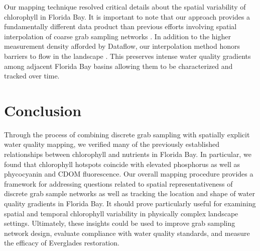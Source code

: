 Our mapping technique resolved critical details about the spatial variability of chlorophyll in Florida Bay. It is important to note that our approach provides a fundamentally different data product than previous efforts involving spatial interpolation of coarse grab sampling networks \citep{fourqurean1993process}. In addition to the higher measurement density afforded by Dataflow, our interpolation method honors barriers to flow in the landscape \citep{stachelek_application_2015}. This preserves intense water quality gradients among adjacent Florida Bay basins allowing them to be characterized and tracked over time.
	
\section{Conclusion}
\label{conclusion}

	Through the process of combining discrete grab sampling with spatially explicit water quality mapping, we verified many of the previously established relationships between chlorophyll and nutrients in Florida Bay. In particular, we found that chlorophyll hotspots coincide with elevated phosphorus as well as phycocyanin and CDOM fluorescence. Our overall mapping procedure provides a framework for addressing questions related to spatial representativeness of discrete grab sample networks as well as tracking the location and shape of water quality gradients in Florida Bay. It should prove particularly useful for examining spatial and temporal chlorophyll variability in physically complex landscape settings.	Ultimately, these insights could be used to improve grab sampling network design, evaluate compliance with water quality standards, and measure the efficacy of Everglades restoration.


%

%


